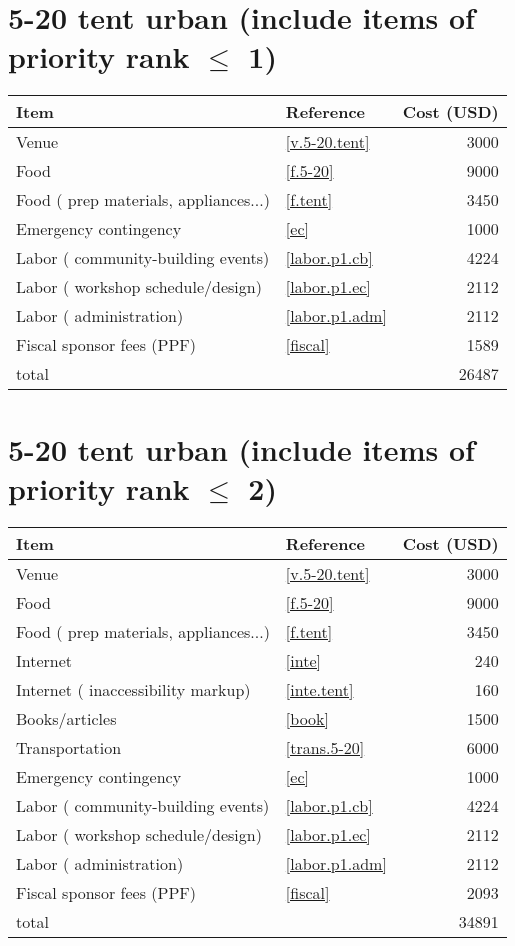 \section*{5-20 tent urban (include items of priority rank $\leq$ 1)}
\begin{center}
\begin{tabular}{llr}
Item & Reference & Cost (USD) \\ \hline
Venue & \ref{v.5-20.tent} & 3000 \\
Food & \ref{f.5-20} & 9000 \\
Food ( prep materials, appliances...) & \ref{f.tent} & 3450 \\
Emergency contingency & \ref{ec} & 1000 \\
Labor ( community-building events) & \ref{labor.p1.cb} & 4224 \\
Labor ( workshop schedule/design) & \ref{labor.p1.ec} & 2112 \\
Labor ( administration) & \ref{labor.p1.adm} & 2112 \\
Fiscal sponsor fees (PPF) & \ref{fiscal} & 1589 \\ \hline
total &  & 26487
\end{tabular}
\end{center}
\newpage
\section*{5-20 tent urban (include items of priority rank $\leq$ 2)}
\begin{center}
\begin{tabular}{llr}
Item & Reference & Cost (USD) \\ \hline
Venue & \ref{v.5-20.tent} & 3000 \\
Food & \ref{f.5-20} & 9000 \\
Food ( prep materials, appliances...) & \ref{f.tent} & 3450 \\
Internet & \ref{inte} & 240 \\
Internet ( inaccessibility markup) & \ref{inte.tent} & 160 \\
Books/articles & \ref{book} & 1500 \\
Transportation & \ref{trans.5-20} & 6000 \\
Emergency contingency & \ref{ec} & 1000 \\
Labor ( community-building events) & \ref{labor.p1.cb} & 4224 \\
Labor ( workshop schedule/design) & \ref{labor.p1.ec} & 2112 \\
Labor ( administration) & \ref{labor.p1.adm} & 2112 \\
Fiscal sponsor fees (PPF) & \ref{fiscal} & 2093 \\ \hline
total &  & 34891
\end{tabular}
\end{center}
\newpage
